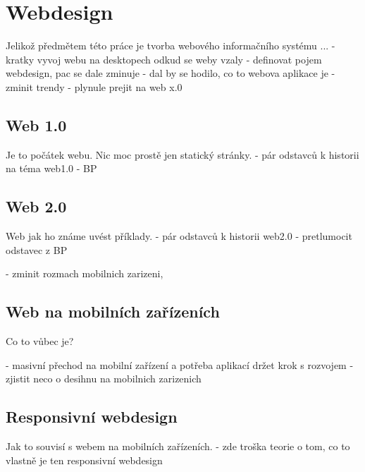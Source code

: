 \documentclass[11pt,oneside]{fithesis}
\begin{document}
\chapter{Webdesign}

Jelikož předmětem této práce je tvorba webového informačního systému ...
- kratky vyvoj webu na desktopech odkud se weby vzaly
- definovat pojem webdesign, pac se dale zminuje
- dal by se hodilo, co to webova aplikace je
- zminit trendy
- plynule prejit na web x.0

\section{Web 1.0}
Je to počátek webu. Nic moc prostě jen statický stránky.
- pár odstavců k historii na téma web1.0
- BP

\section{Web 2.0}
Web jak ho známe uvést příklady.
- pár odstavců k historii web2.0 
- pretlumocit odstavec z BP

- zminit rozmach mobilnich zarizeni,

\section{Web na mobilních zařízeních}
Co to vůbec je?

- masivní přechod na mobilní zařízení a potřeba aplikací držet krok s rozvojem
- zjistit neco o desihnu na mobilnich zarizenich

\section{Responsivní webdesign}
Jak to souvisí s webem na mobilních zařízeních.
- zde troška teorie o tom, co to vlastně je ten responsivní webdesign





















\end{document}
